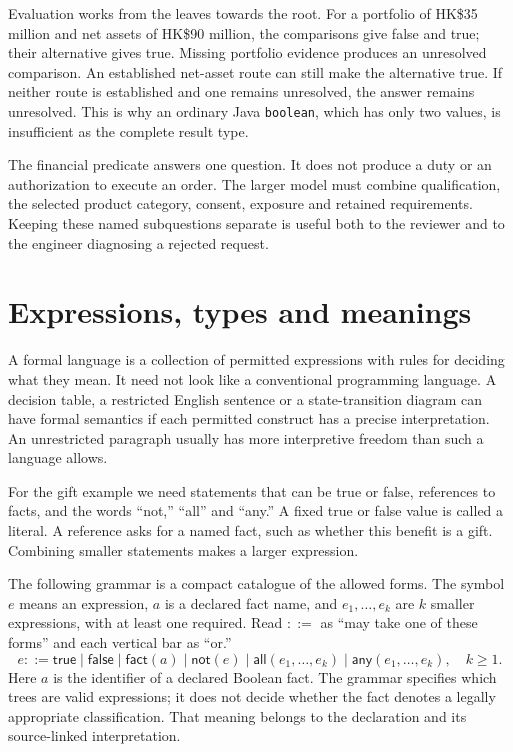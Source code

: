 \documentclass[12pt,a4paper,oneside,openany]{book}
\begin{document}
Evaluation works from the leaves towards the root. For a portfolio of HK\$35
million and net assets of HK\$90 million, the comparisons give false and true;
their alternative gives true. Missing portfolio evidence produces an unresolved
comparison. An established net-asset route can still make the alternative true.
If neither route is established and one remains unresolved, the answer remains
unresolved. This is why an ordinary Java \texttt{boolean}, which has only two
values, is insufficient as the complete result type.

The financial predicate answers one question. It does not produce a duty or an
authorization to execute an order. The larger model must combine qualification,
the selected product category, consent, exposure and retained requirements.
Keeping these named subquestions separate is useful both to the reviewer and
to the engineer diagnosing a rejected request.

\section{Expressions, types and meanings}
\label{merge:M03:04}

\label{sec:proof-language}
A formal language is a collection of permitted expressions with rules for
deciding what they mean. It need not look like a conventional programming
language. A decision table, a restricted English sentence or a state-transition
diagram can have formal semantics if each permitted construct has a precise
interpretation. An unrestricted paragraph usually has more interpretive freedom
than such a language allows.

For the gift example we need statements that can be true or false, references
to facts, and the words ``not,'' ``all'' and ``any.'' A fixed true or false value
is called a literal. A reference asks for a named fact, such as whether this
benefit is a gift. Combining smaller statements makes a larger expression.

The following grammar is a compact catalogue of the allowed forms. The symbol
$e$ means an expression, $a$ is a declared fact name, and $e_1,\ldots,e_k$
are $k$ smaller expressions, with at least one required. Read $::=$ as ``may
take one of these forms'' and each vertical bar as ``or.''
\begin{equation}
 e ::= \mathsf{true}\mid\mathsf{false}\mid\mathsf{fact}(a)
       \mid\mathsf{not}(e)\mid\mathsf{all}(e_1,\ldots,e_k)
       \mid\mathsf{any}(e_1,\ldots,e_k),\quad k\geq 1.
 \label{eq:boolean-grammar}
\end{equation}
Here $a$ is the identifier of a declared Boolean fact. The grammar specifies
which trees are valid expressions; it does not decide whether the fact denotes
a legally appropriate classification. That meaning belongs to the declaration
and its source-linked interpretation.
\end{document}
